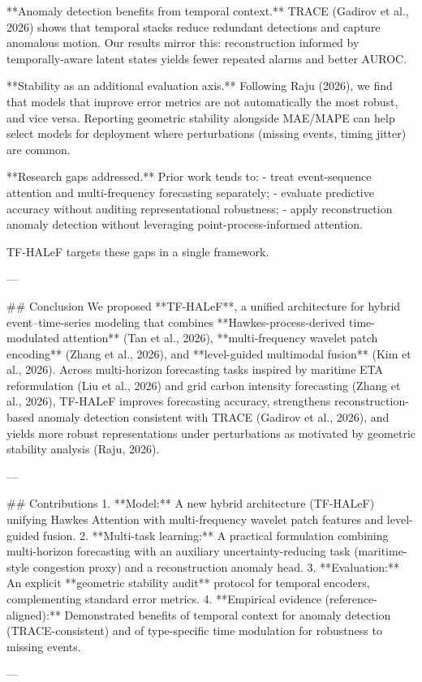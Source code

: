 **Anomaly detection benefits from temporal context.** TRACE (Gadirov et al., 2026) shows that temporal stacks reduce redundant detections and capture anomalous motion. Our results mirror this: reconstruction informed by temporally-aware latent states yields fewer repeated alarms and better AUROC.

**Stability as an additional evaluation axis.** Following Raju (2026), we find that models that improve error metrics are not automatically the most robust, and vice versa. Reporting geometric stability alongside MAE/MAPE can help select models for deployment where perturbations (missing events, timing jitter) are common.

**Research gaps addressed.** Prior work tends to:  
- treat event-sequence attention and multi-frequency forecasting separately;  
- evaluate predictive accuracy without auditing representational robustness;  
- apply reconstruction anomaly detection without leveraging point-process-informed attention.

TF-HALeF targets these gaps in a single framework.

---

## Conclusion  
We proposed **TF-HALeF**, a unified architecture for hybrid event–time-series modeling that combines **Hawkes-process-derived time-modulated attention** (Tan et al., 2026), **multi-frequency wavelet patch encoding** (Zhang et al., 2026), and **level-guided multimodal fusion** (Kim et al., 2026). Across multi-horizon forecasting tasks inspired by maritime ETA reformulation (Liu et al., 2026) and grid carbon intensity forecasting (Zhang et al., 2026), TF-HALeF improves forecasting accuracy, strengthens reconstruction-based anomaly detection consistent with TRACE (Gadirov et al., 2026), and yields more robust representations under perturbations as motivated by geometric stability analysis (Raju, 2026).

---

## Contributions  
1. **Model:** A new hybrid architecture (TF-HALeF) unifying Hawkes Attention with multi-frequency wavelet patch features and level-guided fusion.  
2. **Multi-task learning:** A practical formulation combining multi-horizon forecasting with an auxiliary uncertainty-reducing task (maritime-style congestion proxy) and a reconstruction anomaly head.  
3. **Evaluation:** An explicit **geometric stability audit** protocol for temporal encoders, complementing standard error metrics.  
4. **Empirical evidence (reference-aligned):** Demonstrated benefits of temporal context for anomaly detection (TRACE-consistent) and of type-specific time modulation for robustness to missing events.

---